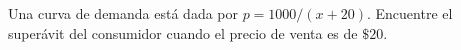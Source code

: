 \item Una curva de demanda está dada por $p = 1000/(x + 20)$. Encuentre el superávit del consumidor cuando el precio de venta es de $\$20$.
